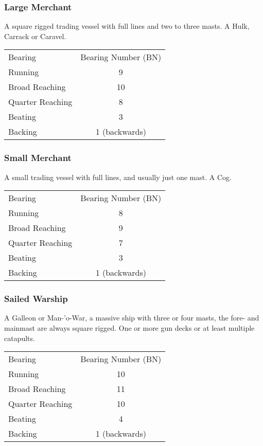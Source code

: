 \documentclass[11pt]{wbzine}
\begin{document}
\begin{multicols}{2}
\subsubsection{Large Merchant}

A square rigged trading vessel with full lines and two to three masts. A
Hulk, Carrack or Caravel.


\begin{tabularx}{\columnwidth}{Zc}
Bearing & Bearing Number (BN) \\
Running & 9 \\
Broad Reaching & 10 \\
Quarter Reaching & 8 \\
Beating & 3 \\
Backing & 1 (backwards) \\
\end{tabularx}

\subsubsection{Small Merchant}

A small trading vessel with full lines, and usually just one mast. A
Cog.


\begin{tabularx}{\columnwidth}{Zc}
Bearing & Bearing Number (BN) \\
Running & 8 \\
Broad Reaching & 9 \\
Quarter Reaching & 7 \\
Beating & 3 \\
Backing & 1 (backwards) \\
\end{tabularx}

\subsubsection{Sailed Warship}

A Galleon or Man-'o-War, a massive ship with three or four masts, the
fore- and mainmast are always square rigged. One or more gun decks or at
least multiple catapults.


\begin{tabularx}{\columnwidth}{Zc}
Bearing & Bearing Number (BN) \\
Running & 10 \\
Broad Reaching & 11 \\
Quarter Reaching & 10 \\
Beating & 4 \\
Backing & 1 (backwards) \\
\end{tabularx}


\end{multicols}
\end{document}
